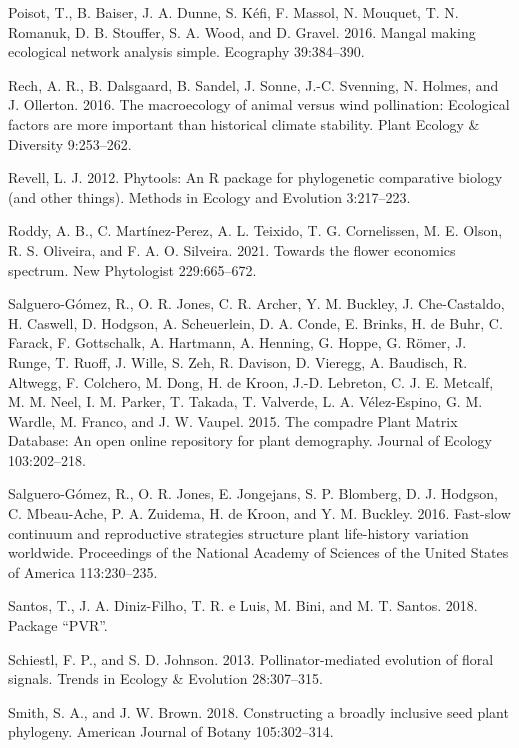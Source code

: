 \documentclass[11pt,a4paper,]{article}
\begin{document}
\hypertarget{ref-poisot2016}{}
Poisot, T., B. Baiser, J. A. Dunne, S. Kéfi, F. Massol, N. Mouquet, T.
N. Romanuk, D. B. Stouffer, S. A. Wood, and D. Gravel. 2016. Mangal
making ecological network analysis simple. Ecography 39:384--390.

\hypertarget{ref-rech2016}{}
Rech, A. R., B. Dalsgaard, B. Sandel, J. Sonne, J.-C. Svenning, N.
Holmes, and J. Ollerton. 2016. The macroecology of animal versus wind
pollination: Ecological factors are more important than historical
climate stability. Plant Ecology \& Diversity 9:253--262.

\hypertarget{ref-revell2012}{}
Revell, L. J. 2012. Phytools: An R package for phylogenetic comparative
biology (and other things). Methods in Ecology and Evolution 3:217--223.

\hypertarget{ref-roddy2021}{}
Roddy, A. B., C. Martínez-Perez, A. L. Teixido, T. G. Cornelissen, M. E.
Olson, R. S. Oliveira, and F. A. O. Silveira. 2021. Towards the flower
economics spectrum. New Phytologist 229:665--672.

\hypertarget{ref-salguero2015}{}
Salguero-Gómez, R., O. R. Jones, C. R. Archer, Y. M. Buckley, J.
Che-Castaldo, H. Caswell, D. Hodgson, A. Scheuerlein, D. A. Conde, E.
Brinks, H. de Buhr, C. Farack, F. Gottschalk, A. Hartmann, A. Henning,
G. Hoppe, G. Römer, J. Runge, T. Ruoff, J. Wille, S. Zeh, R. Davison, D.
Vieregg, A. Baudisch, R. Altwegg, F. Colchero, M. Dong, H. de Kroon,
J.-D. Lebreton, C. J. E. Metcalf, M. M. Neel, I. M. Parker, T. Takada,
T. Valverde, L. A. Vélez-Espino, G. M. Wardle, M. Franco, and J. W.
Vaupel. 2015. The compadre Plant Matrix Database: An open online
repository for plant demography. Journal of Ecology 103:202--218.

\hypertarget{ref-salguero2016}{}
Salguero-Gómez, R., O. R. Jones, E. Jongejans, S. P. Blomberg, D. J.
Hodgson, C. Mbeau-Ache, P. A. Zuidema, H. de Kroon, and Y. M. Buckley.
2016. Fast-slow continuum and reproductive strategies structure plant
life-history variation worldwide. Proceedings of the National Academy of
Sciences of the United States of America 113:230--235.

\hypertarget{ref-santos2018}{}
Santos, T., J. A. Diniz-Filho, T. R. e Luis, M. Bini, and M. T. Santos.
2018. Package ``PVR''.

\hypertarget{ref-schiestl2013}{}
Schiestl, F. P., and S. D. Johnson. 2013. Pollinator-mediated evolution
of floral signals. Trends in Ecology \& Evolution 28:307--315.

\hypertarget{ref-smith2018}{}
Smith, S. A., and J. W. Brown. 2018. Constructing a broadly inclusive
seed plant phylogeny. American Journal of Botany 105:302--314.
\end{document}
